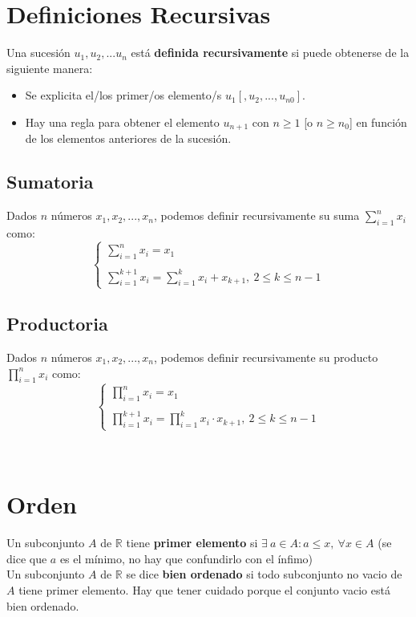 \documentclass[11pt,a4paper]{article}
\begin{document}
\noindent \dotfill
\section{Definiciones Recursivas}
Una sucesi\'on $u_1, u_2, ... u_n$ est\'a \textbf{definida recursivamente} si puede obtenerse de la siguiente manera:
\begin{itemize}
\item Se explicita el/los primer/os elemento/s $u_1 [, u_2, ..., u_{n0}]$.
\item Hay una regla para obtener el elemento $u_{n+1}$ con $n\geq1$ [o $n\geq n_0$] en funci\'on de los elementos anteriores de la sucesi\'on.
\end{itemize}


\subsection{Sumatoria}
Dados $n$ n\'umeros $x_1, x_2, ..., x_n$, podemos definir recursivamente su suma $\displaystyle{\sum_{i=1}^n}x_i$ como: 
$$\left\{\begin{array}{l}
\sum_{i=1}^nx_i = x_1\\ \\
\sum_{i=1}^{k+1}x_i = \sum_{i=1}^{k}x_i + x_{k+1},\ 2\leq k \leq n-1
\end{array}\right.$$

\subsection{Productoria}
Dados $n$ n\'umeros $x_1, x_2, ..., x_n$, podemos definir recursivamente su producto $\displaystyle{\prod_{i=1}^n}x_i$ como: 
$$\left\{\begin{array}{l}
\prod_{i=1}^nx_i = x_1\\ \\
\prod_{i=1}^{k+1}x_i = \prod_{i=1}^{k}x_i \cdot x_{k+1},\ 2\leq k \leq n-1
\end{array}\right.$$

\noindent \dotfill \\

\section{Orden}
\noindent Un subconjunto $A$ de $\mathbb{R}$ tiene \textbf{primer elemento} si $\exists\ a \in A : a \leq x,\ \forall x \in A$ (se dice que $a$ es el m\'inimo, no hay que confundirlo con el \'infimo)\\
\noindent Un subconjunto $A$ de $\mathbb{R}$ se dice \textbf{bien ordenado} si todo subconjunto no vacio de $A$ tiene primer elemento. Hay que tener cuidado porque el conjunto vacio est\'a bien ordenado.\\
\end{document}
